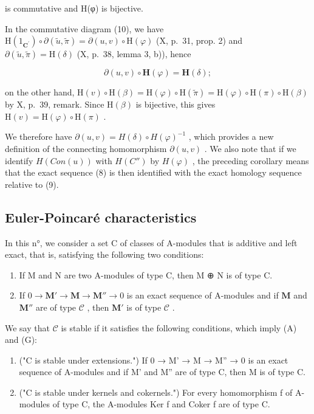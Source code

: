 is commutative and H(φ) is bijective.

In the commutative diagram (10), we have \(\mathrm{H}(1_{\mathbf{C}^{\prime}})\circ \partial (\tilde{u},\tilde{\pi}) = \partial (u,v)\circ \mathrm{H}(\varphi)\) (X, p.~31, prop. 2) and \(\partial (\tilde{u},\tilde{\pi}) = \mathrm{H}(\delta)\) (X, p.~38, lemma 3, b)), hence

\[
\partial (u, v) \circ \mathbf {H} (\varphi) = \mathbf {H} (\delta);
\]

on the other hand, \(\mathrm{H}(v) \circ \mathrm{H}(\beta) = \mathrm{H}(\varphi) \circ \mathrm{H}(\tilde{\pi}) = \mathrm{H}(\varphi) \circ \mathrm{H}(\pi) \circ \mathrm{H}(\beta)\) by X, p.~39, remark. Since \(\mathrm{H}(\beta)\) is bijective, this gives \(\mathrm{H}(v) = \mathrm{H}(\varphi) \circ \mathrm{H}(\pi)\) .

We therefore have \(\partial(u, v) = H(\delta) \circ H(\varphi)^{-1}\) , which provides a new definition of the connecting homomorphism \(\partial(u, v)\) . We also note that if we identify \(H(Con(u))\) with \(H(C'')\) by \(H(\varphi)\) , the preceding corollary means that the exact sequence (8) is then identified with the exact homology sequence relative to (9).

\subsection{Euler-Poincaré characteristics}

In this n°, we consider a set C of classes of A-modules that is additive and left exact, that is, satisfying the following two conditions:

\begin{enumerate}
\def\labelenumi{(\Alph{enumi})}
\item
  If M and N are two A-modules of type C, then M ⊕ N is of type C.
\item
  If \(0 \to \mathbf{M}' \to \mathbf{M} \to \mathbf{M}'' \to 0\) is an exact sequence of A-modules and if \(\mathbf{M}\) and \(\mathbf{M}''\) are of type \(\mathcal{C}\) , then \(\mathbf{M}'\) is of type \(\mathcal{C}\) .
\end{enumerate}

We say that \(\mathcal{C}\) is stable if it satisfies the following conditions, which imply (A) and (G):

\begin{enumerate}
\def\labelenumi{(\Alph{enumi})}
\setcounter{enumi}{4}
\item
  ("C is stable under extensions.") If 0 → M' → M → M'' → 0 is an exact sequence of A-modules and if M' and M'' are of type C, then M is of type C.
\item
  ("C is stable under kernels and cokernels.") For every homomorphism f of A-modules of type C, the A-modules Ker f and Coker f are of type C.
\end{enumerate}

